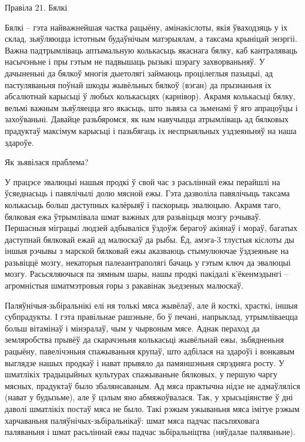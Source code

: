 Правіла 21. Бялкі

Бялкі – гэта найважнейшая частка рацыёну, амінакіслоты, якія ўваходзяць у іх склад, зьяўляюцца істотным будаўнічым матэрыялам, а таксама крыніцай энэргіі. Важна падтрымліваць аптымальную колькасьць якаснага бялку, каб кантраляваць насычэньне і пры гэтым не падвышаць рызыкі шэрагу захворваньняў. У дачыненьні да бялкоў многія дыетолягі займаюць процілеглыя пазыцыі, ад пастуляваньня поўнай шкоды жывёльных бялкоў (вэган) да прызнаньня іх абсалютнай карысьці ў любых колькасьцях (карнівор). Акрамя колькасьці бялку, вельмі важным зьяўляецца яго якасьць, што зьвяза са зьменамі ў яго апрацоўцы і захоўваньні. Давайце разьбяромся, як нам навучыцца атрымліваць ад бялковых прадуктаў максімум карысьці і пазьбягаць іх неспрыяльных уздзеяньняў на наша здароўе.

Як зьявілася праблема?

У працэсе эвалюцыі нашыя продкі ў свой час з расьліннай ежы перайшлі на ўсяеднасьць і павялічылі долю мясной ежы. Гэта дазволіла павялічыць таксама колькасьць больш даступных калёрыяў і паскорыць эвалюцыю. Акрамя таго, бялковая ежа ўтрымлівала шмат важных для разьвіцьця мозгу рэчываў. Першасныя міграцыі людзей адбываліся ўздоўж берагоў акіянаў і мораў, багатых даступнай бялковай ежай ад малюскаў да рыбы. Ёд, амэга-3 тлустыя кіслоты ды іншыя рэчывы з марской бялковай ежы аказваюць стымулюючае ўздзеяньне на разьвіццё мозгу, некаторыя палеаантраполягі бачаць у гэтым ключ да эвалюцыі мозгу. Расьсяляючыся па зямным шары, нашы продкі пакідалі к'ёкенмэдынгі – агромністыя шматмэтровыя горы з ракавінак зьедзеных малюскаў.

Паляўнічыя-зьбіральнікі елі ня толькі мяса жывёлаў, але й косткі, храсткі, іншыя субпрадукты. І гэта правільнае рашэньне, бо ў печані, напрыклад, утрымліваецца больш вітамінаў і мінэралаў, чым у чырвоным мясе. Аднак пераход да земляробства прывёў да скарачэньня колькасьці жывёльнай ежы, зьбядненьня рацыёну, павелічэньня спажываньня крупаў, што адбілася на здароўі і вонкавым выглядзе нашых продкаў і нават прывяло да памяншэньня сярэдняга росту.
У шматлікіх традыцыйных культурах спажываньне бялковых, у першую чаргу мясных, прадуктаў было збалянсаваным. Ад мяса практычна нідзе не адмаўляліся (нават у будызьме), але ў цэлым яно абмяжоўвалася. Так, у хрысьціянстве ў дні даволі шматлікіх постаў мяса не было. Такі рэжым ужываньня мяса імітуе рэжым харчаваньня паляўнічых-зьбіральнікаў: шмат мяса падчас пасьпяховага паляваньня і шмат расьліннай ежы падчас зьбіральніцтва (няўдалае паляваньне).

